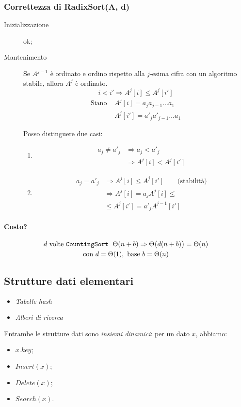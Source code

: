 \subsubsection{Correttezza di RadixSort(A, d)}
\begin{description}
	\item[Inizializzazione] ok;
	\item[Mantenimento] Se $A^{j-1}$ è ordinato e ordino rispetto alla $j$-esima cifra con
	un algoritmo stabile, allora $A^j$ è ordinato.
	$$i < i' \Rightarrow A^j[i] \leq A^j[i']$$
	\begin{align*}
		\text{Siano } & A^j[i] = a_j a_{j-1} \dots a_1 \\
		& A^j[i'] = a'_j a'_{j-1} \dots a_1
	\end{align*}
	
	Posso distinguere due casi:
	\begin{enumerate}
		\item \begin{align*}
			a_j \neq a'_j & \Rightarrow a_j < a'_j \\
			& \Rightarrow A^j[i] < A^j[i']
		\end{align*}
		\item \begin{align*}
			a_j = a'_j & \Rightarrow A^j[i] \leq A^j[i'] \qquad \text{(stabilità)}\\
			& \Rightarrow A^j[i] = a_j A^j[i] \leq \\
			& \leq A^j[i'] = a'_j A^{j-1}[i']
		\end{align*}
	\end{enumerate}
\end{description}

\paragraph{Costo?} 
\begin{gather*}
	d \text{ volte \texttt{CountingSort} } \; \Theta(n+b) \Rightarrow \Theta\big(d(n+b)\big) = \Theta(n) \\
	\text{con } d = \Theta(1), \text{ base } b = \Theta(n) 
\end{gather*}

\subsection{Strutture dati elementari}
\begin{itemize}[noitemsep]
	\item \emph{Tabelle hash}
	\item \emph{Alberi di ricerca}
\end{itemize}
Entrambe le strutture dati sono \emph{insiemi dinamici}: per un dato $x$, abbiamo:
\begin{itemize}[noitemsep]
	\item $x.key$;
	\item $Insert(x)$;
	\item $Delete(x)$;
	\item $Search(x)$.
\end{itemize}
